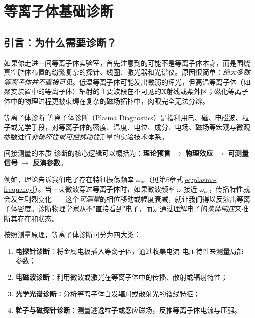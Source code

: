 \chapter{等离子体基础诊断}
\label{chap:diagnostics}

\begin{abstract}
等离子体是"看不见摸得着"的物质第四态。它不像固体、液体或普通气体那样可以直接观察，却又遍布从实验室到宇宙空间的各个角落。本章将系统介绍四种基础诊断手段——电探针、微波、光学光谱和磁探针——并阐明一个核心思想：\emph{诊断是等离子体理论预言与实验观测之间的桥梁}。每一种诊断方法，本质上都是将第2章的德拜屏蔽、第5章的磁流体力学、第6章的电磁波传播和第7章的动理学分布函数等抽象概念，转化为电压表、示波器和光谱仪上可读取的信号。
\end{abstract}

\section{引言：为什么需要诊断？}
\label{sec:12.1}

如果你走进一间等离子体实验室，首先注意到的可能不是等离子体本身，而是围绕真空腔体布置的纷繁复杂的探针、线圈、激光器和光谱仪。原因很简单：\emph{绝大多数等离子体并不直接可见}。低温等离子体可能发出微弱的辉光，但高温等离子体（如聚变装置中的等离子体）辐射的主要波段在不可见的X射线或紫外区；磁化等离子体中的物理过程更被束缚在复杂的磁场拓扑中，肉眼完全无法分辨。

\begin{definition}{等离子体诊断}{}{}
等离子体诊断（Plasma Diagnostics）是指利用电、磁、电磁波、粒子或光学手段，对等离子体的密度、温度、电位、成分、电场、磁场等宏观与微观参数进行\emph{非破坏性或可控扰动性}测量的实验技术体系。
\end{definition}

\begin{insight}{间接测量的本质}{}{}
诊断的核心逻辑可以概括为：\textbf{理论预言} $\rightarrow$ \textbf{物理效应} $\rightarrow$ \textbf{可测量信号} $\rightarrow$ \textbf{反演参数}。

例如，理论告诉我们电子存在特征振荡频率 $\omega_{pe}$（见第6章式\eqref{eq:plasma-frequency}）。当一束微波穿过等离子体时，如果微波频率 $\omega$ 接近 $\omega_{pe}$，传播特性就会发生剧烈变化——这个\emph{可测量}的相位移动或幅度衰减，就让我们得以反演出等离子体密度。诊断物理学家从不"直接看到"电子，而是通过理解电子的\emph{集体响应}来推断其存在和状态。
\end{insight}

按照测量原理，等离子体诊断可分为四大类：
\begin{enumerate}
    \item \textbf{电探针诊断}：将金属电极插入等离子体，通过收集电流-电压特性来测量局部参数；
    \item \textbf{电磁波诊断}：利用微波或激光在等离子体中的传播、散射或辐射特性；
    \item \textbf{光学光谱诊断}：分析等离子体自发辐射或散射光的谱线特征；
    \item \textbf{粒子与磁探针诊断}：测量逃逸粒子或感应磁场，反推等离子体电流与压强。
\end{enumerate}

